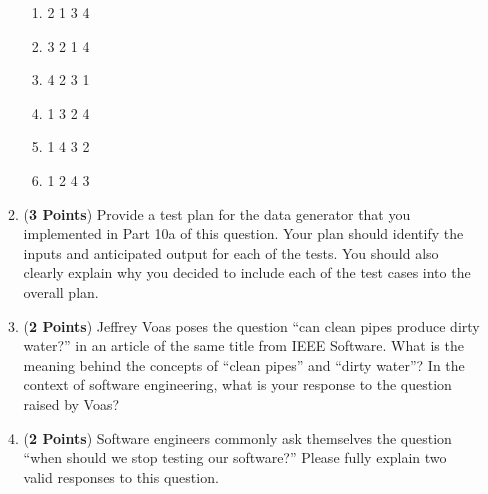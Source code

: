 \documentclass[12pt,epsf,psfig,graphics]{article}
\begin{document}
\begin{enumerate}
\begin{enumerate}
    \begin{enumerate}

    \item 2 1 3 4
      
    \item 3 2 1 4

    \item 4 2 3 1

    \item 1 3 2 4
        
    \item 1 4 3 2

    \item 1 2 4 3

  \end{enumerate}

  \item ({\bf 3 Points}) Provide a test plan for the data generator
    that you implemented in Part 10a of this question.  Your plan
    should identify the inputs and anticipated output for each of the
    tests.  You should also clearly explain why you decided to include
    each of the test cases into the overall plan.

  \item ({\bf 2 Points}) Jeffrey Voas poses the question ``can clean
    pipes produce dirty water?'' in an article of the same title from
    IEEE Software.  What is the meaning behind the concepts of ``clean
    pipes'' and ``dirty water''?  In the context of software
    engineering, what is your response to the question raised by Voas?

  \item ({\bf 2 Points}) Software engineers commonly ask themselves
    the question ``when should we stop testing our software?''  Please
    fully explain two valid responses to this question.


\end{enumerate}

\end{enumerate}
\end{document}
